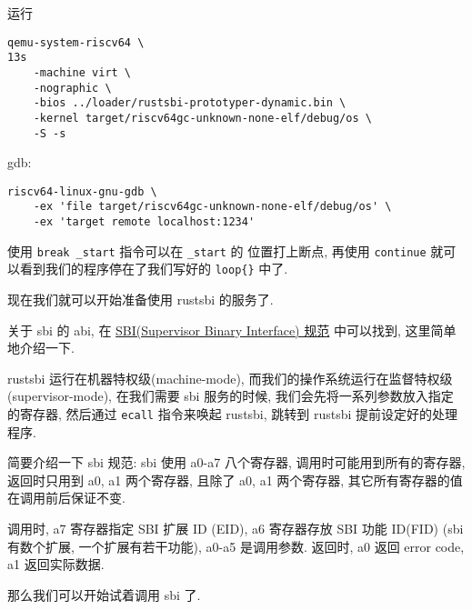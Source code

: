 \documentclass[a4paper]{ctexart}
\begin{document}



运行
\begin{lstlisting}
qemu-system-riscv64 \                                                                                    13s
    -machine virt \
    -nographic \
    -bios ../loader/rustsbi-prototyper-dynamic.bin \
    -kernel target/riscv64gc-unknown-none-elf/debug/os \
    -S -s
\end{lstlisting}

gdb:
\begin{lstlisting}
riscv64-linux-gnu-gdb \
    -ex 'file target/riscv64gc-unknown-none-elf/debug/os' \
    -ex 'target remote localhost:1234'
\end{lstlisting}

使用 \verb|break _start| 指令可以在 \verb|_start| 的
位置打上断点, 再使用
\verb|continue| 就可以看到我们的程序停在了我们写好的
\verb|loop{}| 中了.



现在我们就可以开始准备使用 rustsbi 的服务了.

关于 sbi 的 abi, 在 \href{https://github.com/riscv-non-isa/riscv-sbi-doc}
{SBI(Supervisor Binary Interface) 规范} 中可以找到,
这里简单地介绍一下.

rustsbi 运行在机器特权级(machine-mode),
而我们的操作系统运行在监督特权级(supervisor-mode),
在我们需要 sbi 服务的时候,
我们会先将一系列参数放入指定的寄存器,
然后通过 \verb|ecall| 指令来唤起 rustsbi,
跳转到 rustsbi 提前设定好的处理程序.

简要介绍一下 sbi 规范:
sbi 使用 a0-a7 八个寄存器,
调用时可能用到所有的寄存器,
返回时只用到 a0, a1 两个寄存器,
且除了 a0, a1 两个寄存器,
其它所有寄存器的值在调用前后保证不变.

调用时, a7 寄存器指定 SBI 扩展 ID (EID),
a6 寄存器存放 SBI 功能 ID(FID)
(sbi有数个扩展, 一个扩展有若干功能),
a0-a5 是调用参数.
返回时, a0 返回 error code, a1 返回实际数据.

那么我们可以开始试着调用 sbi 了.
\end{document}
